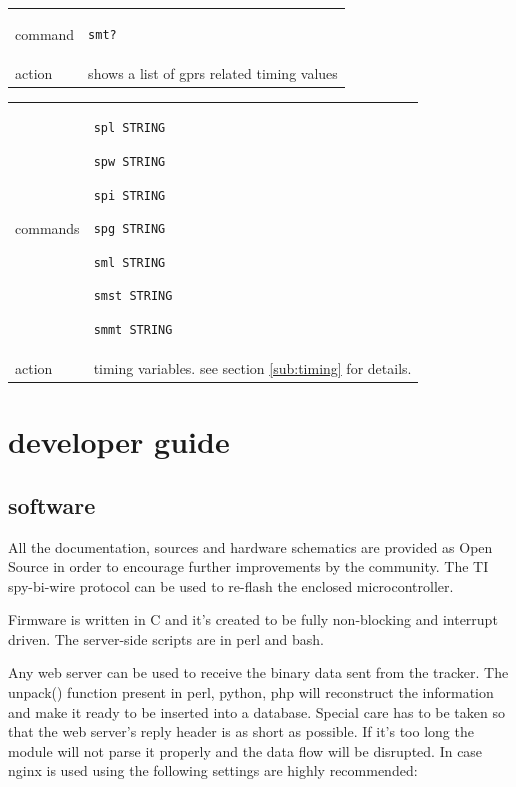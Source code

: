 \documentclass[a4paper,twoside]{refart}
\begin{document}
\begin{tabular}{ |l|p{8cm}| }
    \hline
        command & 
\begin{lstlisting}
smt?
\end{lstlisting} \\
        action & 
shows a list of gprs related timing values\\ \hline
\end{tabular}

\begin{tabular}{ |l|p{8cm}| }
    \hline
        commands & 
\begin{lstlisting}
spl STRING
\end{lstlisting}
\begin{lstlisting}
spw STRING
\end{lstlisting}
\begin{lstlisting}
spi STRING
\end{lstlisting}
\begin{lstlisting}
spg STRING
\end{lstlisting}
\begin{lstlisting}
sml STRING
\end{lstlisting}
\begin{lstlisting}
smst STRING
\end{lstlisting}
\begin{lstlisting}
smmt STRING
\end{lstlisting} \\
        action &
timing variables. see section \ref{sub:timing} for details.
\\ \hline
\end{tabular}


\section{developer guide}
\subsection{software}

All the documentation, sources and hardware schematics are provided as Open Source in order to encourage further improvements by the community. The TI spy-bi-wire protocol can be used to re-flash the enclosed microcontroller.

Firmware is written in C and it's created to be fully non-blocking and interrupt driven. The server-side scripts are in perl and bash.

Any web server can be used to receive the binary data sent from the tracker. The unpack() function present in perl, python, php will reconstruct the information and make it ready to be inserted into a database. Special care has to be taken so that the web server's reply header is as short as possible. If it's too long the module will not parse it properly and the data flow will be disrupted. In case nginx is used using the following settings are highly recommended:
\end{document}
